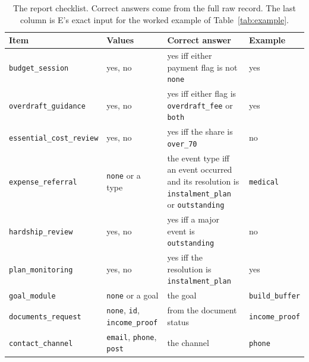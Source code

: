 \documentclass[11pt]{article}
\newcommand{\code}[1]{\texttt{#1}}
\begin{document}
\begin{table}[htbp]
\centering\footnotesize
\caption{The report checklist. Correct answers come from the full raw record. The last column is E's exact input for the worked example of Table~\ref{tab:example}.}
\label{tab:checklist}
\begin{tabular}{@{}llL{6.3cm}l@{}}
\toprule
Item & Values & Correct answer & Example \\
\midrule
\code{budget\_session} & yes, no & yes iff either payment flag is not \code{none} & yes \\
\code{overdraft\_guidance} & yes, no & yes iff either flag is \code{overdraft\_fee} or \code{both} & yes \\
\code{essential\_cost\_review} & yes, no & yes iff the share is \code{over\_70} & no \\
\code{expense\_referral} & \code{none} or a type & the event type iff an event occurred and its resolution is \code{instalment\_plan} or \code{outstanding} & \code{medical} \\
\code{hardship\_review} & yes, no & yes iff a major event is \code{outstanding} & no \\
\code{plan\_monitoring} & yes, no & yes iff the resolution is \code{instalment\_plan} & yes \\
\code{goal\_module} & \code{none} or a goal & the goal & \code{build\_buffer} \\
\code{documents\_request} & \code{none}, \code{id}, \code{income\_proof} & from the document status & \code{income\_proof} \\
\code{contact\_channel} & \code{email}, \code{phone}, \code{post} & the channel & \code{phone} \\
\bottomrule
\end{tabular}
\end{table}
\end{document}
